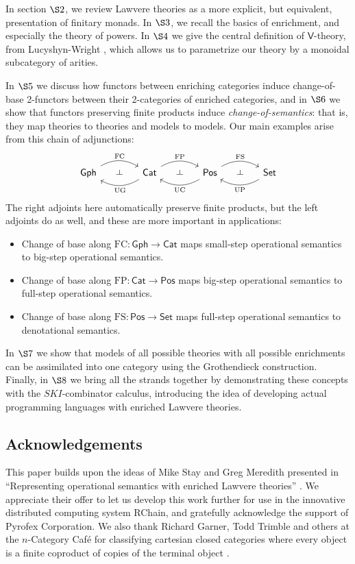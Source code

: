\documentclass{amsart}
\theoremstyle{definition}
\def\ld{\rotatebox[origin=c]{-90}{$\dashv$}} %
\newcommand{\Gph}{\mathsf{Gph}}
\newcommand{\Set}{\mathsf{Set}}
\newcommand{\Cat}{\mathsf{Cat}}
\newcommand{\Pos}{\mathsf{Pos}}
\newcommand{\V}{\mathsf{V}}
\newcommand{\FC}{\mathrm{FC}}
\newcommand{\FP}{\mathrm{FP}}
\newcommand{\FS}{\mathrm{FS}}
\newcommand{\UC}{\mathrm{UC}}
\newcommand{\UP}{\mathrm{UP}}
\newcommand{\UG}{\mathrm{UG}}
\newcommand{\maps}{\colon}
\begin{document}
In section $\S2$, we review Lawvere theories as a more explicit, but equivalent, presentation of finitary monads. In $\S3$, we recall the basics of enrichment, and especially the theory of powers.  In $\S4$ we give the central definition of $\V$-theory, from Lucyshyn-Wright \cite{lucyshyn-wright}, which allows us to parametrize our theory by a monoidal subcategory of arities.

In $\S5$ we discuss how functors between enriching categories induce change-of-base 2-functors between their 2-categories of enriched categories, and in $\S6$ we show that functors preserving finite products induce \textit{change-of-semantics}: that is, they map theories to theories and models to models.   Our main examples arise from this chain of adjunctions:
\[\begin{tikzcd}[column sep=small]
\Gph \arrow[bend left,below]{rr}{\FC}
& \ld &
\arrow[bend left,above]{ll}{\UG} \Cat \arrow[bend left,below]{rr}{\FP}
& \ld &
\arrow[bend left,above]{ll}{\UC} \Pos \arrow[bend left,below]{rr}{\FS}
& \ld &
\Set \arrow[bend left,above]{ll}{\UP}
\end{tikzcd}\]
The right adjoints here automatically preserve finite products, but the left adjoints 
do as well, and these are more important in applications:
\begin{itemize}
\item 
Change of base along $\FC \maps \Gph \to \Cat$ maps small-step operational semantics to big-step operational semantics.
\item
Change of base along $\FP \maps \Cat \to \Pos$ maps big-step operational semantics to full-step operational semantics.
\item
Change of base along $\FS \maps \Pos \to \Set$ maps full-step operational semantics to
denotational semantics.
\end{itemize}

In $\S7$ we show that models of all possible theories with all possible enrichments can be assimilated into one category using the Grothendieck construction.  Finally, in $\S8$ we bring all the strands together by demonstrating these concepts with the $SKI$-combinator calculus, introducing the idea of developing actual programming languages with enriched Lawvere theories.

\subsection*{Acknowledgements}

This paper builds upon the ideas of Mike Stay and Greg Meredith presented in ``Representing operational semantics with enriched Lawvere theories''  \cite{roswelt}.  We appreciate their offer to let us develop this work further for use in the innovative distributed computing system RChain, and gratefully acknowledge the support of Pyrofex Corporation.  We also thank Richard Garner, Todd Trimble and others at the $n$-Category Caf\'e for classifying cartesian closed categories
where every object is a finite coproduct of copies of the terminal object \cite{nCafe}.
\end{document}
